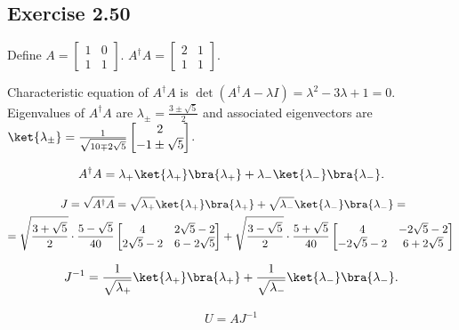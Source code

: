 \documentclass[a4paper,12pt]{article}
\begin{document}
\subsection*{Exercise 2.50}
Define
$A = \begin{bmatrix}
1 & 0 \\
1 & 1
\end{bmatrix}$.
%
$A^\dagger A = \begin{bmatrix}
2 & 1 \\
1 & 1
\end{bmatrix}$.

 Characteristic equation of $A^\dagger A$ is $\det(A^\dagger A - \lambda I) = \lambda^2 - 3 \lambda + 1 = 0$.
 Eigenvalues of $A^\dagger A$ are $\lambda_\pm = \frac{3 \pm \sqrt{5}}{2}$
 and associated eigenvectors are $\ket{\lambda_\pm} = \frac{1}{\sqrt{10 \mp 2 \sqrt{5}}} \begin{bmatrix}
 2 \\
 -1 \pm \sqrt{5}
 \end{bmatrix} $.

\begin{align*}
	A^\dagger A = \lambda_+ \ket{\lambda_+}\bra{\lambda_+} + \lambda_- \ket{\lambda_-}\bra{\lambda_-}.
\end{align*}

 \begin{align*}
 	J = \sqrt{A^\dagger A} &= \sqrt{\lambda_+} \ket{\lambda_+}\bra{\lambda_+} + \sqrt{\lambda_-} \ket{\lambda_-}\bra{\lambda_-}=\\
 		= \sqrt{\frac{3 + \sqrt{5}}{2}} \cdot \frac{5 - \sqrt{5}}{40} &\begin{bmatrix}
 		4 & 2\sqrt{5} -2 \\
 		2 \sqrt{5} - 2 & 6 -2\sqrt{5}
 		\end{bmatrix}
 		+
 		\sqrt{\frac{3 - \sqrt{5}}{2}} \cdot \frac{5 + \sqrt{5}}{40} \begin{bmatrix}
 		4 & -2\sqrt{5} -2 \\
 		-2 \sqrt{5} - 2 & 6 +2\sqrt{5}
 		\end{bmatrix}
 \end{align*}


\begin{align*}
	J^{-1} = \frac{1}{\sqrt{\lambda_+}} \ket{\lambda_+}\bra{\lambda_+} + \frac{1}{ \sqrt{\lambda_-}}\ket{\lambda_-}\bra{\lambda_-}.
\end{align*}


\begin{align*}
	U = AJ^{-1}
\end{align*}
\end{document}
